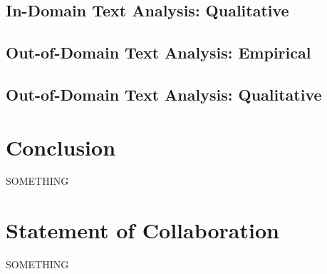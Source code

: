 \documentclass[11pt,a4paper]{article}
\begin{document}

\subsection{In-Domain Text Analysis: Qualitative}%
\label{sub:in_domain_text_analysis_qualitative}



\subsection{Out-of-Domain Text Analysis: Empirical}%
\label{sec:out_domain_text_analysis_empirical}


\subsection{Out-of-Domain Text Analysis: Qualitative}%
\label{sub:out_domain_text_analysis_qualitative}



\section{Conclusion}%
\label{sec:conclusion}

SOMETHING




\section{Statement of Collaboration}
SOMETHING






\appendix
\end{document}

